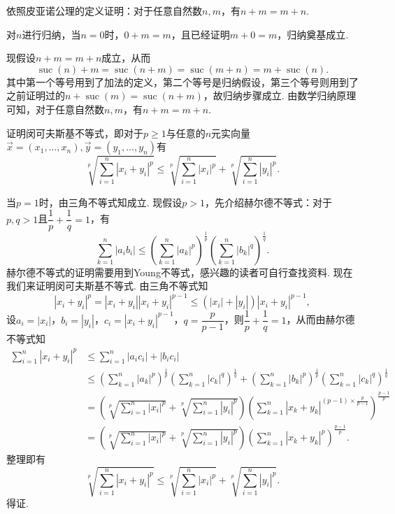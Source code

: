 \begin{exercise}

    \begin{exgroup}[2] %
        \item 依照皮亚诺公理的定义证明：对于任意自然数$n,m$，有$n+m=m+n$.
        \begin{answer}
            对$n$进行归纳，当$n=0$时，$0+m=m$，且已经证明$m+0=m$，归纳奠基成立.

            现假设$n+m=m+n$成立，从而
            \[\operatorname{suc}(n)+m=\operatorname{suc}(n+m)=\operatorname{suc}(m+n)=m+\operatorname{suc}(n).\]
            其中第一个等号用到了加法的定义，第二个等号是归纳假设，第三个等号则用到了之前证明过的$n+\operatorname{suc}(m)=\operatorname{suc}(n+m)$，故归纳步骤成立. 由数学归纳原理可知，对于任意自然数$n,m$，有$n+m=m+n$.
        \end{answer}
    \end{exgroup}

    \begin{exgroup}
        \item 证明闵可夫斯基不等式，即对于$p \geqslant 1$与任意的$n$元实向量$\vec{x}=(x_1,\ldots,x_n),\vec{y}=(y_1,\ldots,y_n)$有
        \[
        \sqrt[p]{\sum_{i=1}^n|x_i+y_i|^p} \leqslant \sqrt[p]{\sum_{i=1}^n|x_i|^p} + \sqrt[p]{\sum_{i=1}^n|y_i|^p}.
        \]

        \begin{answer}
            当$p=1$时，由三角不等式知成立. 现假设$p>1$，先介绍赫尔德不等式：对于$p,q>1$且$\dfrac{1}{p}+\dfrac{1}{q}=1$，有\[\sum_{k=1}^n |a_ib_i| \leqslant \left(\sum_{k=1}^n |a_k|^p\right)^{\frac{1}{p}}\left(\sum_{k=1}^n |b_k|^{q}\right)^{\frac{1}{q}}.\]
            赫尔德不等式的证明需要用到Young不等式，感兴趣的读者可自行查找资料. 现在我们来证明闵可夫斯基不等式. 由三角不等式知
            \[|x_i+y_i|^p = |x_i+y_i||x_i+y_i|^{p-1} \leqslant (|x_i|+|y_i|)|x_i+y_i|^{p-1},\]
            设$a_i=|x_i|$，$b_i=|y_i|$，$c_i=|x_i+y_i|^{p-1}$，$q=\dfrac{p}{p-1}$，则$\dfrac{1}{p}+\dfrac{1}{q}=1$，从而由赫尔德不等式知
            \begin{align*}
                \sum_{i=1}^n |x_i+y_i|^p &\leqslant \sum_{i=1}^n |a_ic_i| + |b_ic_i| \\
                &\leqslant \left(\sum_{k=1}^n |a_k|^p\right)^{\frac{1}{p}}\left(\sum_{k=1}^n |c_k|^{q}\right)^{\frac{1}{q}} + \left(\sum_{k=1}^n |b_k|^{p}\right)^{\frac{1}{p}}\left(\sum_{k=1}^n |c_k|^{q}\right)^{\frac{1}{q}} \\
                &= \left(\sqrt[p]{\sum_{i=1}^n|x_i|^p} + \sqrt[p]{\sum_{i=1}^n|y_i|^p}\right) \left(\sum_{k=1}^n |x_k+y_k|^{(p-1)\times\frac{p}{p-1}}\right)^{\frac{p-1}{p}} \\
                &= \left(\sqrt[p]{\sum_{i=1}^n|x_i|^p} + \sqrt[p]{\sum_{i=1}^n|y_i|^p}\right)\left(\sum_{k=1}^n |x_k+y_k|^p\right)^{\frac{p-1}{p}}.
            \end{align*}
            整理即有
            \[
            \sqrt[p]{\sum_{i=1}^n|x_i+y_i|^p} \leqslant \sqrt[p]{\sum_{i=1}^n|x_i|^p} + \sqrt[p]{\sum_{i=1}^n|y_i|^p}.
            \]
            得证.
        \end{answer}


\end{exgroup}
\end{exercise}
